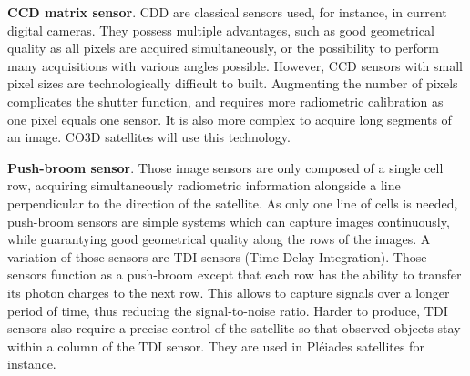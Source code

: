 \textbf{CCD matrix sensor}. CDD are classical sensors used, for instance, in current digital cameras. They possess multiple advantages, such as good geometrical quality as all pixels are acquired simultaneously, or the possibility to perform many acquisitions with various angles possible. However, CCD sensors with small pixel sizes are technologically difficult to built. Augmenting the number of pixels complicates the shutter function, and requires more radiometric calibration as one pixel equals one sensor. It is also more complex to acquire long segments of an image. CO3D satellites will use this technology.

\textbf{Push-broom sensor}. Those image sensors are only composed of a single cell row, acquiring simultaneously radiometric information alongside a line perpendicular to the direction of the satellite. As only one line of cells is needed, push-broom sensors are simple systems which can capture images continuously, while guarantying good geometrical quality along the rows of the images. A variation of those sensors are TDI sensors (Time Delay Integration). Those sensors function as a push-broom except that each row has the ability to transfer its photon charges to the next row. This allows to capture signals over a longer period of time,  thus reducing the signal-to-noise ratio. Harder to produce, TDI sensors also require a precise control of the satellite so that observed objects stay within a column of the TDI sensor. They are used in Pléiades satellites for instance.

